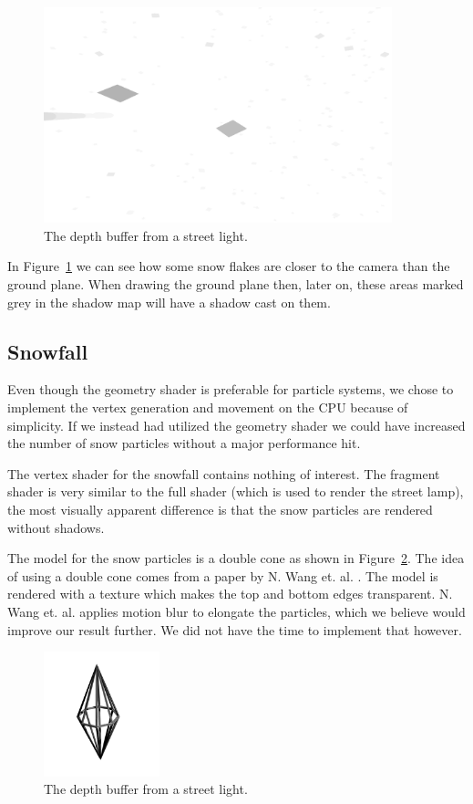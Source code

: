 \documentclass[a4paper,12pt]{article}
\begin{document}
\begin{figure}[ht]
  \centering
  \includegraphics[width=0.9\textwidth]{fbo}
  \caption{\label{fig:fbo-image} The depth buffer from a street light.}
\end{figure}

\noindent
In Figure~\ref{fig:fbo-image} we can see how some snow flakes are closer to the camera than the ground plane. When drawing the ground plane then, later on, these areas marked grey in the shadow map will have a shadow cast on them.

\subsection{Snowfall}
Even though the geometry shader is preferable for particle systems, we chose to implement the vertex generation and movement on the CPU because of simplicity. If we instead had utilized the geometry shader we could have increased the number of snow particles without a major performance hit.

The vertex shader for the snowfall contains nothing of interest. The fragment shader is very similar to the full shader (which is used to render the street lamp), the most visually apparent difference is that the snow particles are rendered without shadows.

The model for the snow particles is a double cone as shown in Figure~\ref{fig:dcone-image}. The idea of using a double cone comes from a paper by N. Wang et. al. \cite{snow-rain}. The model is rendered with a texture which makes the top and bottom edges transparent. N. Wang et. al. applies motion blur to elongate the particles, which we believe would improve our result further. We did not have the time to implement that however.
\begin{figure}[H]
  \centering
  \includegraphics[width=0.3\textwidth]{dcone}
  \caption{\label{fig:dcone-image} The depth buffer from a street light.}
\end{figure}
\end{document}

